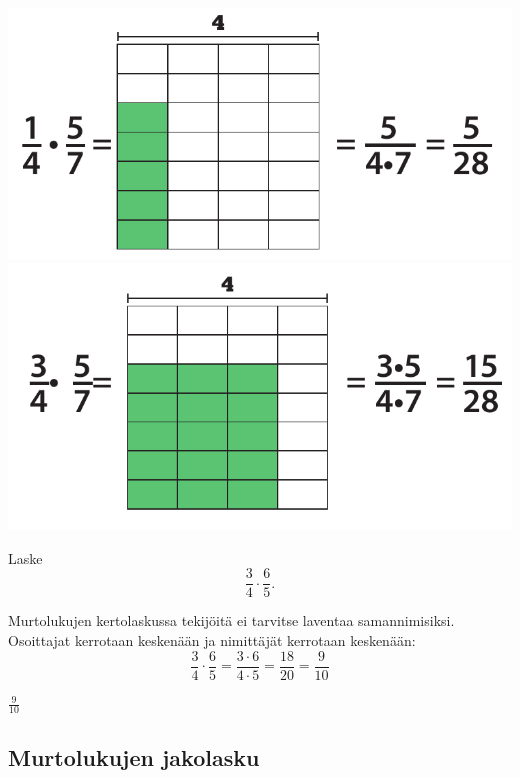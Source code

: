\includegraphics[scale=0.4]{pictures/Kuva3-1-4.pdf}
\includegraphics[scale=0.4]{pictures/Kuva3-1-5.pdf}    
    
\begin{esimerkki}
	Laske
	\[
        \frac{3}{4}\cdot \frac{6}{5}.
        \]
	
        \begin{esimratk}
        Murtolukujen kertolaskussa tekijöitä ei tarvitse laventaa samannimisiksi. Osoittajat kerrotaan keskenään ja nimittäjät kerrotaan keskenään:
      \[
        \frac{3}{4}\cdot \frac{6}{5}= \frac{3\cdot 6}{4\cdot 5}= \frac{18}{20}=\frac{9}{10}
        \]
        \end{esimratk}
        \begin{esimvast}
        $\frac{9}{10}$
        \end{esimvast}
    \end{esimerkki}
    



\subsection{Murtolukujen jakolasku}


